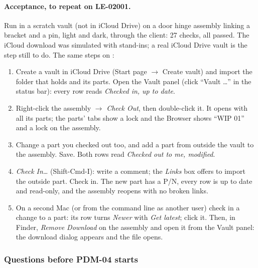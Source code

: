 \paragraph{Acceptance, to repeat on LE-02001.} Run in a scratch vault (not in iCloud Drive) on a door hinge assembly
linking a bracket and a pin, light and dark, through the client: 27 checks, all passed. The iCloud download was
simulated with  stand-ins; a real iCloud Drive vault is the step still to do. The same steps on
:
\begin{enumerate}[nosep]
  \item Create a vault in iCloud Drive (Start page $\rightarrow$ Create vault) and import the folder that holds
         and its parts. Open the Vault panel (click ``Vault \ldots'' in the status bar): every row
        reads \emph{Checked in, up to date}.
  \item Right-click the assembly $\rightarrow$ \emph{Check Out}, then double-click it. It opens with all its parts;
        the parts' tabs show a lock and the Browser shows ``WIP 01'' and a lock on the assembly.
  \item Change a part you checked out too, and add a part from outside the vault to the assembly. Save. Both rows read
        \emph{Checked out to me, modified}.
  \item \emph{Check In\ldots} (Shift-Cmd-I): write a comment; the \emph{Links} box offers to import the outside
        part. Check in. The new part has a P/N, every row is up to date and read-only, and the assembly reopens with
        no broken links.
  \item On a second Mac (or from the command line as another user) check in a change to a part: its row turns
        \emph{Newer} with \emph{Get latest}; click it. Then, in Finder, \emph{Remove Download} on the assembly and
        open it from the Vault panel: the download dialog appears and the file opens.
\end{enumerate}

\subsubsection*{Questions before PDM-04 starts}

